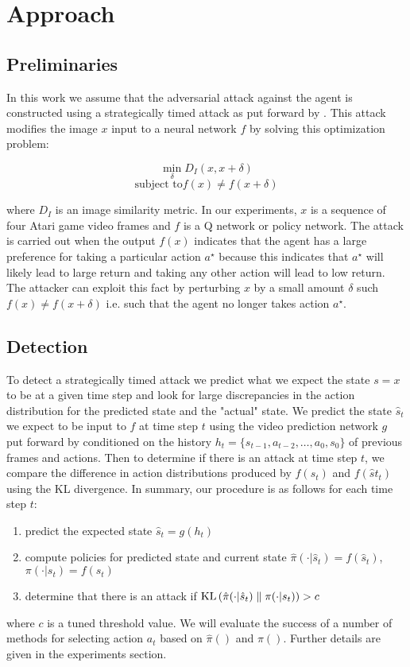 \section{Approach}

\subsection{Preliminaries}
In this work we assume that the adversarial attack against the agent
is constructed using a strategically timed attack as put forward by
\cite{nine}. This attack modifies the image $x$ input to a neural network
$f$ by solving this optimization problem:

$$\min_{\delta}{D_I(x, x + \delta)}$$
$$\mbox{subject to} f(x) \neq f(x + \delta)$$

where $D_I$ is an image similarity metric.
In our experiments, $x$ is a sequence of four Atari game video frames
and $f$ is a Q network or policy network. The attack is carried out when
the output $f(x)$ indicates that the agent has a large preference for
taking a particular action $a^\star$ because this indicates that $a^\star$
will likely lead to large return and taking any other action will lead to
low return. The attacker can exploit this fact by perturbing $x$ by a small
amount $\delta$ such $f(x) \neq f(x + \delta)$ i.e. such that the agent no longer
takes action $a^\star$.

\subsection{Detection}
To detect a strategically timed attack we predict what we expect the state $s = x$
to be at a given time step and look for large discrepancies in the
action distribution for the predicted state and the "actual" state.
We predict the state $\hat s_t$ we expect to be input to $f$ at time step $t$
using the video prediction network $g$ put forward by \cite{fourteen}
conditioned on the history $h_t = \{s_{t-1}, a_{t-2}, \dots, a_0, s_0\}$ of
previous frames and actions. Then to determine if there is an attack
at time step $t$, we compare the difference in action distributions
produced by $f(s_t)$ and $f(\hat st_t)$ using the \textrm{KL} divergence.
In summary, our procedure is as follows for each time step $t$:
\begin{enumerate}
    \item predict the expected state $\hat s_t = g(h_t)$
    \item compute policies for predicted state and current state $\hat \pi( \cdot \vert \hat s_t) = f(\hat s_t)$, $\pi( \cdot \vert s_t) = f(s_t)$
    \item determine that there is an attack if $\textrm{KL}\left(\hat \pi( \cdot \vert \hat s_t)\;\|\;\pi( \cdot \vert s_t)\right) > c$
\end{enumerate}
where $c$ is a tuned threshold value. We will evaluate the success of a number of methods for selecting action $a_t$
based on $\hat \pi()$ and $\pi()$. Further details are given in the experiments section.

